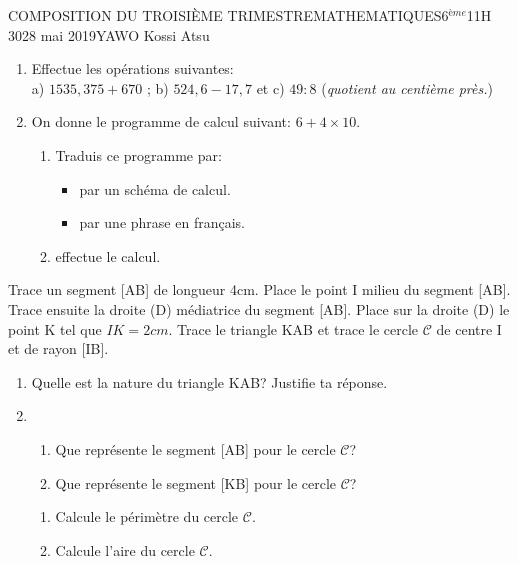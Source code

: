 \documentclass[12pt,a4paper]{book}
\newcommand{\prof}{YAWO Kossi Atsu}
\newcommand{\matiere}{MATHEMATIQUES}
\newcommand{\classe}{6$^{ème}$}
\begin{document}
\newpage
\begin{devoir}{COMPOSITION DU TROISIÈME TRIMESTRE}{\matiere}{\classe}{1}{1H 30}{28 mai 2019}{\prof}
\begin{exo}[4]
\begin{enumerate}
\item Effectue les opérations suivantes:\\
a) $1535,375+670$ \qquad ; \qquad b) $524,6-17,7$ \qquad et \qquad c) $49: 8$ (\emph{quotient au centième près.})
\item On donne le programme de calcul suivant: $6+4\times 10$.
\begin{enumerate}
\item Traduis ce programme par:
\begin{itemize}
\item par un schéma de calcul.
\item par une phrase en français.
\end{itemize}
\item effectue le calcul.
\end{enumerate}
\end{enumerate}
\vspace{0.3cm}
\end{exo}

\begin{exo}[6]
Trace un segment [AB] de longueur 4cm. Place le point I milieu du segment [AB]. Trace ensuite la droite (D) médiatrice du segment [AB]. Place sur la droite (D) le point K tel que $IK=2cm$. Trace le triangle KAB et trace le cercle $\mathcal{C}$ de centre I et de rayon [IB].
\begin{enumerate}
\item Quelle est la nature du triangle KAB? Justifie ta réponse.
\item \begin{enumerate}
\item Que représente le segment [AB] pour le cercle $\mathcal{C}$?
\item Que représente le segment [KB] pour le cercle $\mathcal{C}$?
\end{enumerate}
\begin{enumerate}
\item Calcule le périmètre du cercle $\mathcal{C}$.
\item Calcule l'aire du cercle $\mathcal{C}$.
\end{enumerate}
\end{enumerate}
\vspace{0.3cm}
\end{exo}


\end{devoir}
\end{document}
